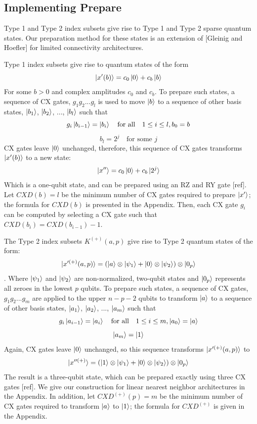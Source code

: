 \documentclass{article}
\begin{document}
\subsection{Implementing Prepare}
Type 1 and Type 2 index subsets give rise to Type 1 and Type 2 sparse quantum
states. Our preparation method for these states is an extension of 
[Gleinig and Hoefler] for limited connectivity architectures.

Type 1 index subsets give rise to quantum states of the form
$$\mathinner{|{x'(b)}\rangle} = c_0\mathinner{|{0}\rangle} + c_b\mathinner{|{b}\rangle}$$
For some $b > 0$ and complex amplitudes $c_0$ and $c_b$. 
To prepare such states, a sequence
of CX gates, $g_1g_2...g_l$ is used to move $\mathinner{|{b}\rangle}$ to a sequence of other
basis states, $\mathinner{|{b_1}\rangle}$, $\mathinner{|{b_2}\rangle}$, ..., $\mathinner{|{b_l}\rangle}$ such that
$$g_i\mathinner{|{b_{i - 1}}\rangle} = \mathinner{|{b_i}\rangle} \quad \text{for all} \quad 1 \leq i \leq l, b_0 = b$$
$$b_l = 2^j \quad \text{for some } j$$
CX gates leave $\mathinner{|{0}\rangle}$ unchanged, therefore, this sequence of CX gates
transforms $\mathinner{|{x'(b)}\rangle}$ to a new state:
$$\mathinner{|{x''}\rangle} = c_0\mathinner{|{0}\rangle} + c_b\mathinner{|{2^j}\rangle}$$
Which is a one-qubit state, and can be prepared using an RZ and RY gate [ref].
Let $CXD(b) = l$ be the minimum number of CX gates required to prepare 
$\mathinner{|{x'}\rangle}$;
the formula for $CXD(b)$ is presented in the Appendix. Then, each CX gate $g_i$
can be computed by selecting a CX gate such that $CXD(b_i) = CXD(b_{i-1}) - 1$.

The Type 2 index subsets $K^{(+)}(a, p)$ give rise to Type 2 quantum states of
the form:
$$\mathinner{|{x'^{(+)}(a, p)}\rangle} = (\mathinner{|{a}\rangle} \otimes \mathinner{|{\psi_1}\rangle} + \mathinner{|{0}\rangle} \otimes \mathinner{|{\psi_2}\rangle}) \otimes \mathinner{|{0_p}\rangle}$$.
Where $\mathinner{|{\psi_1}\rangle}$ and $\mathinner{|{\psi_2}\rangle}$ are non-normalized, two-qubit states and
$\mathinner{|{0_p}\rangle}$ represents all zeroes in the lowest $p$ qubits. To prepare such
states, a sequence of CX gates, $g_1g_2...g_m$ are applied to the upper 
$n - p - 2$ qubits to transform 
$\mathinner{|{a}\rangle}$ to a sequence of other basis states, 
$\mathinner{|{a_1}\rangle}$, $\mathinner{|{a_2}\rangle}$, ..., $\mathinner{|{a_m}\rangle}$ such that
$$g_i\mathinner{|{a_{i - 1}}\rangle} = \mathinner{|{a_i}\rangle} \quad \text{for all} \quad 1 \leq i \leq m, \mathinner{|{a_0}\rangle} = \mathinner{|{a}\rangle}$$
$$\mathinner{|{a_m}\rangle} = \mathinner{|{1}\rangle}$$
Again, CX gates leave $\mathinner{|{0}\rangle}$ unchanged, so this sequence transforms $\mathinner{|{x'^{(+)}(a, p)}\rangle}$ to
$$\mathinner{|{x''^{(+)}}\rangle} = (\mathinner{|{1}\rangle} \otimes \mathinner{|{\psi_1}\rangle} + \mathinner{|{0}\rangle} \otimes \mathinner{|{\psi_2}\rangle}) \otimes \mathinner{|{0_p}\rangle}$$
The result is a three-qubit state, which can be prepared exactly using three CX
gates [ref]. We give our construction for linear nearest neighbor architectures
in the Appendix. In addition, let $CXD^{(+)}(p) = m$ be the minimum number of
CX gates required to transform $\mathinner{|{a}\rangle}$ to $\mathinner{|{1}\rangle}$; the formula for 
$CXD^{(+)}$ is given in the Appendix.
\end{document}
